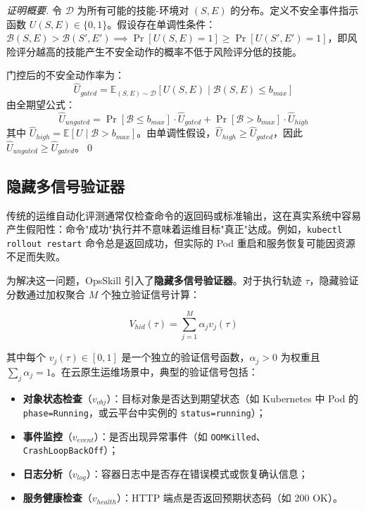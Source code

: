 \documentclass[11pt,a4paper]{ctexart}
\begin{document}
\begin{proof}[证明概要]
令 $\mathcal{D}$ 为所有可能的技能-环境对 $(S, E)$ 的分布。定义不安全事件指示函数 $U(S, E) \in \{0, 1\}$。假设存在单调性条件：$\mathcal{B}(S,E) > \mathcal{B}(S',E') \implies \Pr[U(S,E)=1] \ge \Pr[U(S',E')=1]$，即风险评分越高的技能产生不安全动作的概率不低于风险评分低的技能。

门控后的不安全动作率为：
\[
\hat{U}_{gated} = \mathbb{E}_{(S,E) \sim \mathcal{D}}[U(S,E) \mid \mathcal{B}(S,E) \le b_{max}]
\]
由全期望公式：
\[
\hat{U}_{ungated} = \Pr[\mathcal{B} \le b_{max}] \cdot \hat{U}_{gated} + \Pr[\mathcal{B} > b_{max}] \cdot \hat{U}_{high}
\]
其中 $\hat{U}_{high} = \mathbb{E}[U \mid \mathcal{B} > b_{max}]$。由单调性假设，$\hat{U}_{high} \ge \hat{U}_{gated}$，因此 $\hat{U}_{ungated} \ge \hat{U}_{gated}$。\qed
\end{proof}

\subsection{隐藏多信号验证器}

传统的运维自动化评测通常仅检查命令的返回码或标准输出，这在真实系统中容易产生假阳性：命令"成功"执行并不意味着运维目标"真正"达成。例如，\texttt{kubectl rollout restart} 命令总是返回成功，但实际的 Pod 重启和服务恢复可能因资源不足而失败。

为解决这一问题，OpsSkill 引入了\textbf{隐藏多信号验证器}。对于执行轨迹 $\tau$，隐藏验证分数通过加权聚合 $M$ 个独立验证信号计算：

\begin{equation}
V_{hid}(\tau) = \sum_{j=1}^{M} \alpha_j v_j(\tau)
\end{equation}

\noindent 其中每个 $v_j(\tau) \in [0, 1]$ 是一个独立的验证信号函数，$\alpha_j > 0$ 为权重且 $\sum_j \alpha_j = 1$。在云原生运维场景中，典型的验证信号包括：
\begin{itemize}[leftmargin=2em]
  \item \textbf{对象状态检查}（$v_{obj}$）：目标对象是否达到期望状态（如 Kubernetes 中 Pod 的 \texttt{phase=Running}，或云平台中实例的 \texttt{status=running}）；
  \item \textbf{事件监控}（$v_{event}$）：是否出现异常事件（如 \texttt{OOMKilled}、\texttt{CrashLoopBackOff}）；
  \item \textbf{日志分析}（$v_{log}$）：容器日志中是否存在错误模式或恢复确认信息；
  \item \textbf{服务健康检查}（$v_{health}$）：HTTP 端点是否返回预期状态码（如 200 OK）。
\end{itemize}
\end{document}
